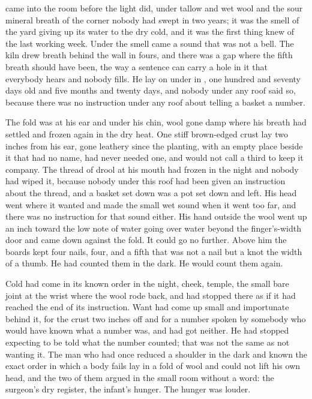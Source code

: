 
 came into the room before the light did, under tallow and wet wool and the sour mineral breath of the corner nobody had swept in two years; it was the smell of the yard giving up its water to the dry cold, and it was the first thing  knew of the last working week. Under the smell came a sound that was not a bell. The kiln drew breath behind the wall in fours, and there was a gap where the fifth breath should have been, the way a sentence can carry a hole in it that everybody hears and nobody fills. He lay on  under  in , one hundred and seventy days old and five months and twenty days, and nobody under any roof said so, because there was no instruction under any roof about telling a basket a number.

The fold was at his ear and under his chin, wool gone damp where his breath had settled and frozen again in the dry heat. One stiff brown-edged crust lay two inches from his ear, gone leathery since the planting, with an empty place beside it that had no name, had never needed one, and would not call a third to keep it company. The thread of drool at his mouth had frozen in the night and nobody had wiped it, because nobody under this roof had been given an instruction about the thread, and a basket set down was a pot set down and left. His head went where it wanted and made the small wet sound when it went too far, and there was no instruction for that sound either. His hand outside the wool went up an inch toward the low note of water going over water beyond the finger's-width door and came down against the fold. It could go no further. Above him the boards kept four nails, four, and a fifth that was not a nail but a knot the width of a thumb. He had counted them in the dark. He would count them again.

Cold had come in its known order in the night, cheek, temple, the small bare joint at the wrist where the wool rode back, and had stopped there as if it had reached the end of its instruction. Want had come up small and importunate behind it, for the crust two inches off and for a number spoken by somebody who would have known what a number was, and had got neither. He had stopped expecting to be told what the number counted; that was not the same as not wanting it. The man who had once reduced a shoulder in the dark and known the exact order in which a body fails lay in a fold of wool and could not lift his own head, and the two of them argued in the small room without a word: the surgeon's dry register, the infant's hunger. The hunger was louder.

